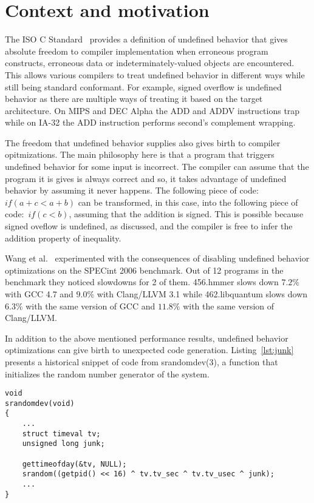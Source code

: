 \section{Context and motivation}

The ISO C Standard~\cite{iso90} provides a definition of undefined
behavior that gives absolute freedom to compiler implementation when
erroneous program constructs, erroneous data or indeterminately-valued
objects are encountered. This allows various compilers to treat
undefined behavior in different ways while still being standard
conformant. For example, signed overflow is undefined behavior as there
are multiple ways of treating it based on the target architecture. On
MIPS and DEC Alpha the ADD and ADDV instructions trap while on IA-32 the
ADD instruction performs second's complement wrapping.

The freedom that undefined behavior supplies also gives birth to
compiler opitmizations. The main philosophy here is that a program that
triggers undefined behavior for some input is incorrect. The compiler
can assume that the program it is gives is always correct and so, it
takes advantage of undefined behavior by assuming it never happens. The
following piece of code:~\textit{\(if (a + c < a + b)\)} can be
transformed, in this case, into the following piece of
code:~\textit{\(if (c < b)\)}, assuming that the addition is signed.
This is possible because signed oveflow is undefined, as discussed, and
the compiler is free to infer the addition property of inequality.

Wang et al.~\cite{wang2012undefined} experimented with the consequences
of disabling undefined behavior optimizations on the SPECint 2006
benchmark. Out of 12 programs in the benchmark they noticed slowdowns
for 2 of them. 456.hmmer slows down $7.2\%$ with GCC 4.7 and $9.0\%$
with Clang/LLVM 3.1 while 462.libquantum slows down $6.3\%$ with the
same version of GCC and $11.8\%$ with the same version of Clang/LLVM.

In addition to the above mentioned performance results, undefined
behavior optimizations can give birth to unexpected code generation.
Listing~\ref{lst:junk} presents a historical snippet of code from
srandomdev(3), a function that initializes the random number generator
of the system.

\begin{lstlisting}[style=Cstyle, caption={srandom function in
lib/libc/stdlib/random.c on BSD systems}, label={lst:junk}]
void
srandomdev(void)
{
	...
	struct timeval tv;
	unsigned long junk;

	gettimeofday(&tv, NULL);
	srandom((getpid() << 16) ^ tv.tv_sec ^ tv.tv_usec ^ junk);
	...
}
\end{lstlisting}

